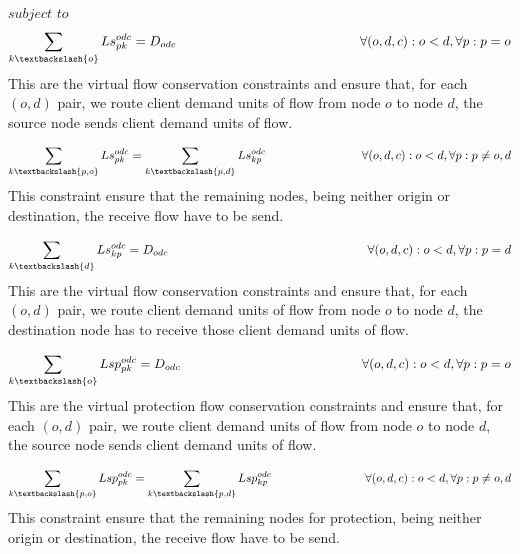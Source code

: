 $subject$ $to$
\begin{equation}
\sum_{k\textbackslash \{o\}} Ls_{pk}^{odc} = D_{odc} \qquad \qquad \qquad \qquad \qquad \qquad \qquad
\forall(o,d,c) : o < d, \forall p: p = o
\label{ILPTranslucp1}
\end{equation}
\noindent
This are the virtual flow conservation constraints and ensure that, for each $(o,d)$ pair, we route client demand units of flow from node $o$ to node $d$, the source node sends client demand units of flow.

\begin{equation}
\sum_{k\textbackslash \{p,o\}} Ls_{pk}^{odc} = \sum_{k\textbackslash \{p,d\}} Ls_{kp}^{odc} \qquad \qquad \qquad \qquad
\forall(o,d,c) : o < d, \forall p: p \neq o,d
\label{ILPTranslucp2}
\end{equation}
\noindent
This constraint ensure that the remaining nodes, being neither origin or destination, the receive flow have to be send.

\begin{equation}
\sum_{k\textbackslash \{d\}} Ls_{kp}^{odc} = D_{odc} \qquad \qquad \qquad \qquad \qquad \qquad \qquad \qquad
\forall(o,d,c) : o < d, \forall p: p = d
\label{ILPTranslucp3}
\end{equation}
\noindent
This are the virtual flow conservation constraints and ensure that, for each $(o,d)$ pair, we route client demand units of flow from node $o$ to node $d$, the destination node has to receive those client demand units of flow.

\begin{equation}
\sum_{k\textbackslash \{o\}} Lsp_{pk}^{odc} = D_{odc} \qquad \qquad \qquad \qquad \qquad \qquad \qquad
\forall(o,d,c) : o < d, \forall p: p = o
\label{ILPTranslucp1p}
\end{equation}
\noindent
This are the virtual protection flow conservation constraints and ensure that, for each $(o,d)$ pair, we route client demand units of flow from node $o$ to node $d$, the source node sends client demand units of flow.

\begin{equation}
\sum_{k\textbackslash \{p,o\}} Lsp_{pk}^{odc} = \sum_{k\textbackslash \{p,d\}} Lsp_{kp}^{odc} \qquad \qquad \qquad \qquad
\forall(o,d,c) : o < d, \forall p: p \neq o,d
\label{ILPTranslucp2p}
\end{equation}
\noindent
This constraint ensure that the remaining nodes for protection, being neither origin or destination, the receive flow have to be send.

